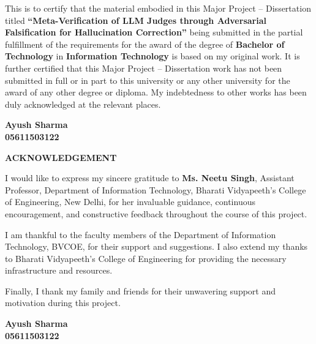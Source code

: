 \documentclass[12pt, a4paper]{report}
\begin{document}
\noindent
This is to certify that the material embodied in this Major Project -- Dissertation
titled \textbf{``Meta-Verification of LLM Judges through Adversarial Falsification for Hallucination Correction''} being submitted in the partial fulfillment of the
requirements for the award of the degree of \textbf{Bachelor of Technology} in
\textbf{Information Technology} is based on my original work. It is further certified
that this Major Project -- Dissertation work has not been submitted in full or in part
to this university or any other university for the award of any other degree or diploma.
My indebtedness to other works has been duly acknowledged at the relevant places.

\vspace{3cm}
\begin{flushright}
\textbf{Ayush Sharma} \\
\textbf{05611503122}
\end{flushright}

\newpage
\thispagestyle{empty}
\begin{center}
    {\fontsize{16}{20}\bfseries ACKNOWLEDGEMENT}
\end{center}
\vspace{1cm}
\onehalfspacing

\noindent
I would like to express my sincere gratitude to \textbf{Ms. Neetu Singh},
Assistant Professor, Department of Information Technology, Bharati
Vidyapeeth's College of Engineering, New Delhi, for her invaluable guidance,
continuous encouragement, and constructive feedback throughout the course of this
project.

\vspace{0.5cm}
\noindent
I am thankful to the faculty members of the Department of Information Technology,
BVCOE, for their support and suggestions. I also extend my thanks to Bharati
Vidyapeeth's College of Engineering for providing the necessary infrastructure and
resources.

\vspace{0.5cm}
\noindent
Finally, I thank my family and friends for their unwavering support and motivation
during this project.

\vspace{2cm}
\begin{flushright}
\textbf{Ayush Sharma} \\
\textbf{05611503122}
\end{flushright}
\end{document}
